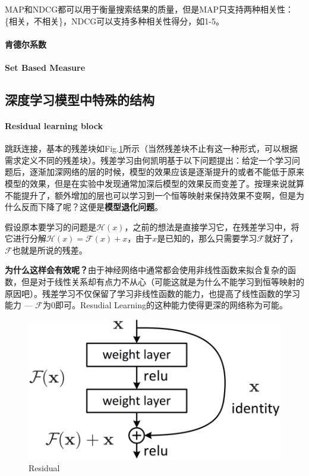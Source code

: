 MAP和NDCG都可以用于衡量搜索结果的质量，但是MAP只支持两种相关性：\{相关，不相关\}，NDCG可以支持多种相关性得分，如1-5。


\paragraph{肯德尔系数}

\paragraph{Set Based Measure}

\subsection{深度学习模型中特殊的结构}
\paragraph{Residual learning block}
跳跃连接，基本的残差块如Fig.\ref{fig:residual}所示（当然残差块不止有这一种形式，可以根据需求定义不同的残差块）。残差学习由何凯明基于以下问题提出：给定一个学习问题后，逐渐加深网络的层的时候，模型的效果应该是逐渐提升的或者不能低于原来模型的效果，但是在实验中发现通常加深后模型的效果反而变差了。按理来说就算不能提升了，额外增加的层也可以学习到一个恒等映射来保持效果不变啊，但是为什么反而下降了呢？这便是\textbf{模型退化问题}。

假设原本要学习的问题是$\mathcal{H}(x)$，之前的想法是直接学习它，在残差学习中，将它进行分解$\mathcal{H}(x) = \mathcal{F}(x) + x$，由于$x$是已知的，那么只需要学习$\mathcal{F}$就好了，$\mathcal{F}$也就是所说的残差。

\textbf{为什么这样会有效呢？}由于神经网络中通常都会使用非线性函数来拟合复杂的函数，但是对于线性关系却有点力不从心（可能这就是为什么不能学习到恒等映射的原因吧）。残差学习不仅保留了学习非线性函数的能力，也提高了线性函数的学习能力 --- $\mathcal{F}$为0即可。Resudial Learning的这种能力使得更深的网络称为可能。

\begin{figure}[h]
	\centering
	\includegraphics[width=.4\textwidth]{pics/Residual.png}
	\caption{Residual}
	\label{fig:residual}
\end{figure}

